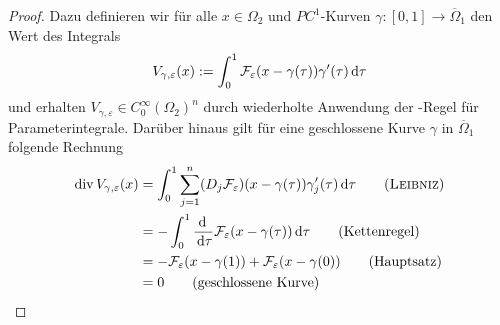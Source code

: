 \begin{proof}
  Dazu definieren wir für alle $x\in\Omega_2$ und $PC^1$\hyp{}Kurven $\gamma \colon [0,1] \to \overline\Omega_1$ den Wert des Integrals
  $$
  V_{\gamma,\varepsilon}(x) := \int_0^1 \mathcal{F}_\varepsilon(x - \gamma(\tau))\gamma'(\tau)\, {\operatorname{d}\!{\tau}}
  $$
  und erhalten $V_{\gamma,\varepsilon} \in C_0^\infty(\Omega_2)^n$ durch wiederholte Anwendung der \leibniz\hyp{}Regel für Parameterintegrale.
  Darüber hinaus gilt für eine geschlossene Kurve $\gamma$ in $\overline\Omega_1$ folgende Rechnung
  \begingroup
  \addtolength{\jot}{0.5em}
  \begin{align*}
    \div V_{\gamma,\varepsilon}(x) 
    &= \int_0^1 \sum_{j=1}^n (D_j \mathcal{F}_\varepsilon)(x - \gamma(\tau))\gamma_j'(\tau) \d\tau \tag{\leibniz}\\
    &= -\int_0^1 \frac{\d\ }{\d\tau}\mathcal{F}_\varepsilon(x - \gamma(\tau)) \d\tau \tag{Kettenregel}\\
    &= - \mathcal{F}_\varepsilon(x - \gamma(1)) + \mathcal{F}_\varepsilon(x - \gamma(0)) \tag{Hauptsatz}\\
    &= 0 \tag{geschlossene Kurve}
  \end{align*}
  \endgroup


\end{proof}
